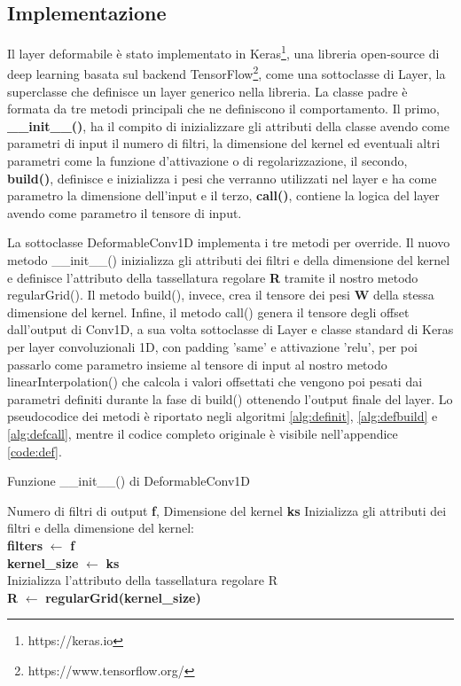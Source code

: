 \documentclass[12pt,a4paper]{report}
\begin{document}
    \subsection{Implementazione}
    Il layer deformabile \`e stato implementato in Keras\footnote{https://keras.io}, 
    una libreria open-source di deep learning basata sul backend 
    TensorFlow\footnote{https://www.tensorflow.org/}, come una sottoclasse 
    di Layer, la superclasse che definisce un layer generico nella libreria.
    La classe padre \`e formata da tre metodi principali che ne definiscono il 
    comportamento. Il primo, \textbf{\_\_init\_\_()}, ha il compito di inizializzare 
    gli attributi della classe avendo come parametri di input il numero di filtri,
    la dimensione del kernel ed eventuali altri parametri come la funzione 
    d'attivazione o di regolarizzazione, il secondo, \textbf{build()}, definisce e 
    inizializza i pesi che verranno utilizzati nel layer e ha come parametro 
    la dimensione dell'input e il terzo, \textbf{call()}, contiene la logica del 
    layer avendo come parametro il tensore di input. 

    La sottoclasse DeformableConv1D implementa i tre metodi per override. 
    Il nuovo metodo \_\_init\_\_() inizializza gli attributi dei filtri e della 
    dimensione del kernel e definisce l'attributo della tassellatura regolare 
    \textbf{R} tramite il nostro metodo regularGrid(). Il metodo build(), invece, 
    crea il tensore dei pesi \textbf{W} della stessa dimensione del kernel. 
    Infine, il metodo call() genera il tensore degli offset dall'output di Conv1D,
    a sua volta sottoclasse di Layer e classe standard di Keras per layer 
    convoluzionali 1D, con padding 'same' e attivazione 'relu', per poi passarlo 
    come parametro insieme al tensore di input al nostro metodo linearInterpolation()
    che calcola i valori offsettati che vengono poi pesati dai parametri definiti 
    durante la fase di build() ottenendo l'output finale del layer.
    Lo pseudocodice dei metodi \`e riportato negli algoritmi \ref{alg:definit}, 
    \ref{alg:defbuild} e \ref{alg:defcall}, mentre il codice completo originale 
    \`e visibile nell'appendice \ref{code:def}.

    \begin{algorithm}[t] 
        \caption{Funzione \_\_init\_\_() di DeformableConv1D}
        \begin{algorithmic} \label{alg:definit}
            \REQUIRE Numero di filtri di output \textbf{f}, 
            Dimensione del kernel \textbf{ks}
            \STATE Inizializza gli attributi dei filtri e della dimensione del 
            kernel:\\ 
            \quad\textbf{filters} $\gets$ \textbf{f} \\
            \quad\textbf{kernel\_size} $\gets$ \textbf{ks} \\
            \STATE Inizializza l'attributo della tassellatura regolare R\\ 
            \quad\textbf{R} $\gets$ \textbf{regularGrid(kernel\_size)}
        \end{algorithmic}
    \end{algorithm}
\end{document}
